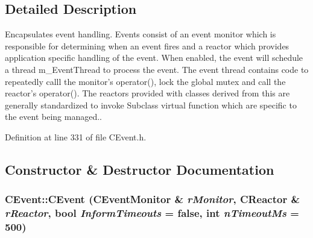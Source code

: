 \subsection{Detailed Description}
Encapsulates event handling. Events consist of an event monitor which is responsible for determining when an event fires and a reactor which provides application specific handling of the event.  When enabled, the event will schedule a thread m\_\-Event\-Thread to process the event. The event thread contains code to repeatedly calll the monitor's operator(), lock the global mutex and call the reactor's operator(). The reactors provided with  classes derived from this are generally standardized to invoke Subclass virtual function which are specific to the event being managed.. 



Definition at line 331 of file CEvent.h.

\subsection{Constructor \& Destructor Documentation}
\subsubsection{\setlength{\rightskip}{0pt plus 5cm}CEvent::CEvent ({\bf CEvent\-Monitor} \& {\em r\-Monitor}, {\bf CReactor} \& {\em r\-Reactor}, bool {\em Inform\-Timeouts} = false, int {\em n\-Timeout\-Ms} = 500)}\label{classCEvent_a0}


